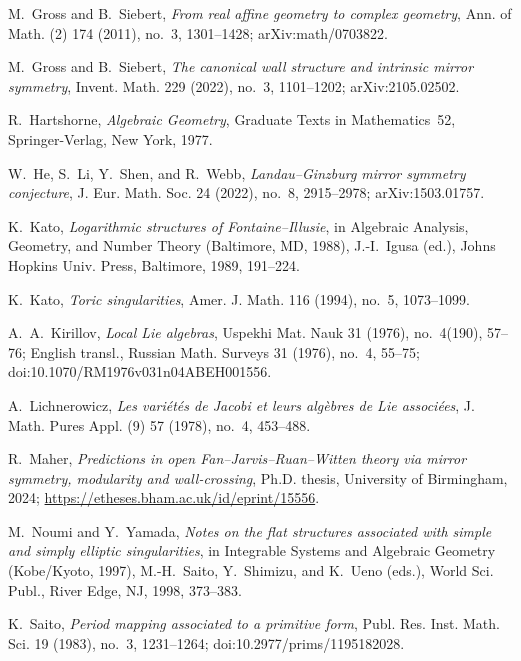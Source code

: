  M.~Gross and B.~Siebert,
\emph{From real affine geometry to complex geometry},
Ann. of Math. (2) 174 (2011), no.~3, 1301--1428; arXiv:math/0703822.

 M.~Gross and B.~Siebert,
\emph{The canonical wall structure and intrinsic mirror symmetry},
Invent. Math. 229 (2022), no.~3, 1101--1202; arXiv:2105.02502.

 R.~Hartshorne,
\emph{Algebraic Geometry}, Graduate Texts in Mathematics~52,
Springer-Verlag, New York, 1977.

 W.~He, S.~Li, Y.~Shen, and R.~Webb,
\emph{Landau--Ginzburg mirror symmetry conjecture},
J. Eur. Math. Soc. 24 (2022), no.~8, 2915--2978; arXiv:1503.01757.

 K.~Kato,
\emph{Logarithmic structures of Fontaine--Illusie},
in Algebraic Analysis, Geometry, and Number Theory (Baltimore, MD, 1988),
J.-I.~Igusa (ed.), Johns Hopkins Univ. Press, Baltimore, 1989, 191--224.

 K.~Kato,
\emph{Toric singularities}, Amer. J. Math. 116 (1994), no.~5, 1073--1099.

 A.~A.~Kirillov,
\emph{Local Lie algebras}, Uspekhi Mat. Nauk 31 (1976), no.~4(190), 57--76;
English transl., Russian Math. Surveys 31 (1976), no.~4, 55--75;
doi:10.1070/RM1976v031n04ABEH001556.

 A.~Lichnerowicz,
\emph{Les vari\'et\'es de Jacobi et leurs alg\`ebres de Lie associ\'ees},
J. Math. Pures Appl. (9) 57 (1978), no.~4, 453--488.

 R.~Maher,
\emph{Predictions in open Fan--Jarvis--Ruan--Witten theory via mirror
symmetry, modularity and wall-crossing}, Ph.D. thesis, University of
Birmingham, 2024; \url{https://etheses.bham.ac.uk/id/eprint/15556}.

 M.~Noumi and Y.~Yamada,
\emph{Notes on the flat structures associated with simple and simply elliptic
singularities}, in Integrable Systems and Algebraic Geometry (Kobe/Kyoto,
1997), M.-H.~Saito, Y.~Shimizu, and K.~Ueno (eds.), World Sci. Publ., River
Edge, NJ, 1998, 373--383.

 K.~Saito,
\emph{Period mapping associated to a primitive form},
Publ. Res. Inst. Math. Sci. 19 (1983), no.~3, 1231--1264;
doi:10.2977/prims/1195182028.

